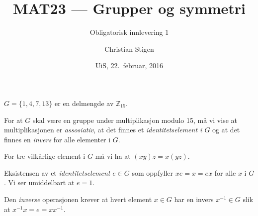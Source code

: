 \documentclass[a4paper,norsk,12pt]{article}
\title{MAT23   --- Grupper og symmetri}
\subtitle{Obligatorisk innlevering 1}
\author{Christian Stigen}
\date{UiS, 22.~februar, 2016}
\begin{document}
\maketitle


$G = \{ 1, 4, 7, 13 \}$ er en delmengde av $\mathbb{Z}_{15}$.

For at $G$ skal være en gruppe under multiplikasjon modulo 15, må vi vise at
multiplikasjonen er \textit{assosiativ}, at det finnes et
\textit{identitetselement i $G$} og at det finnes en \textit{invers} for alle
elementer i $G$.

For tre vilkårlige element i $G$ må vi ha at $(xy)z = x(yz)$.

Eksistensen av et \textit{identitetselement} $e \in G$ som oppfyller $xe = x = ex$ for
alle $x$ i $G$. Vi ser umiddelbart at $e = 1$.

Den \textit{inverse} operasjonen krever at hvert element $x \in G$ har en
invers $x^{-1} \in G$ slik at $x^{-1}x = e = xx^{-1}$.



\end{document}
